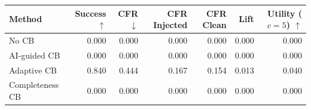 \begin{tabular}{lrrrrrr}
\toprule
Method & Success $\uparrow$ & CFR $\downarrow$ & CFR Injected & CFR Clean & Lift & Utility ($c=5$) $\uparrow$ \\
\midrule
No CB & 0.000 & 0.000 & 0.000 & 0.000 & 0.000 & 0.000 \\
AI-guided CB & 0.000 & 0.000 & 0.000 & 0.000 & 0.000 & 0.000 \\
Adaptive CB & 0.840 & 0.444 & 0.167 & 0.154 & 0.013 & 0.040 \\
Completeness CB & 0.000 & 0.000 & 0.000 & 0.000 & 0.000 & 0.000 \\
\bottomrule
\end{tabular}
